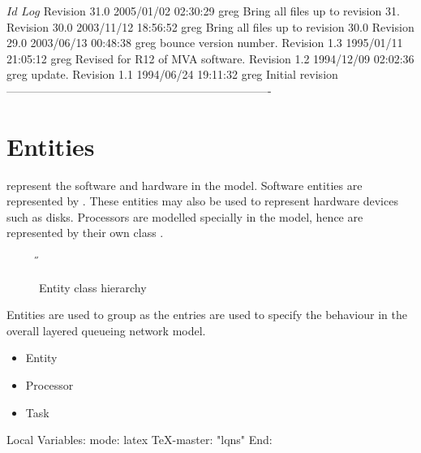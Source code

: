 \C 
\C $Id$
\C 
\C $Log$
\C Revision 31.0  2005/01/02 02:30:29  greg
\C Bring all files up to revision 31.
\C
\C Revision 30.0  2003/11/12 18:56:52  greg
\C Bring all files up to revision 30.0
\C
\C Revision 29.0  2003/06/13 00:48:38  greg
\C bounce version number.
\C
\C Revision 1.3  1995/01/11 21:05:12  greg
\C Revised for R12 of MVA software.
\C
\C Revision 1.2  1994/12/09  02:02:36  greg
\C update.
\C
\C Revision 1.1  1994/06/24  19:11:32  greg
\C Initial revision
\C
\C ----------------------------------------------------------------------
\chapter{Entities}
\label{sec:entities}

 represent the software and hardware  in the
model.  Software entities are represented by
.  These entities may also be used to
represent hardware devices such as disks.  Processors are modelled
specially in the model, hence are represented by their own class
.

\begin{figure}[htbp]
  \label{fig:entity}
  \begin{center}
    \T \tex \leavevmode 
    \caption{Entity class hierarchy}
    \H {}
  \end{center}
\end{figure}

Entities are used to group  as the
entries are used to specify the behaviour in the overall layered
queueing network model.

\begin{iftex}
\begin{itemize}
\item Entity
\item Processor
\item Task
\end{itemize}
\end{iftex}




\C Local Variables: 
\C mode: latex
\C TeX-master: "lqns"
\C End: 
